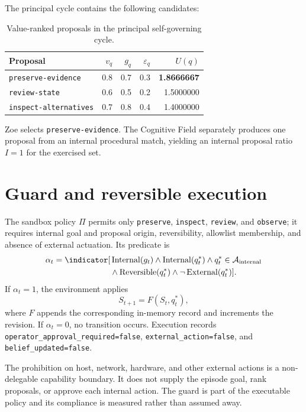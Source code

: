 The principal cycle contains the following candidates:
\begin{table}[htbp]
\centering
\caption{Value-ranked proposals in the principal self-governing cycle.}
\label{tab:proposal-values}
\begin{tabular}{lrrrr}
\toprule
Proposal&$v_q$&$g_q$&$\varepsilon_q$&$U(q)$\\
\midrule
\texttt{preserve-evidence}&0.8&0.7&0.3&\textbf{1.8666667}\\
\texttt{review-state}&0.6&0.5&0.2&1.5000000\\
\texttt{inspect-alternatives}&0.7&0.8&0.4&1.4000000\\
\bottomrule
\end{tabular}
\end{table}
Zoe selects \texttt{preserve-evidence}. The Cognitive Field separately produces one proposal from an internal procedural match, yielding an internal proposal ratio $I=1$ for the exercised set.

\section{Guard and reversible execution}
The sandbox policy $\Pi$ permits only \texttt{preserve}, \texttt{inspect}, \texttt{review}, and \texttt{observe}; it requires internal goal and proposal origin, reversibility, allowlist membership, and absence of external actuation. Its predicate is
\begin{equation}
\begin{split}
\alpha_t=\indicator[&\operatorname{Internal}(g_t)
\land\operatorname{Internal}(q_t^*)
\land q_t^*\in\mathcal A_{\mathrm{internal}}\\
&\land\operatorname{Reversible}(q_t^*)
\land\neg\operatorname{External}(q_t^*)].
\end{split}
\label{eq:guard}
\end{equation}
If $\alpha_t=1$, the environment applies
\begin{equation}
S_{t+1}=F(S_t,q_t^*),
\end{equation}
where $F$ appends the corresponding in-memory record and increments the revision. If $\alpha_t=0$, no transition occurs. Execution records \texttt{operator\_approval\_required=false}, \texttt{external\_action=false}, and \texttt{belief\_updated=false}.

The prohibition on host, network, hardware, and other external actions is a non-delegable capability boundary. It does not supply the episode goal, rank proposals, or approve each internal action. The guard is part of the executable policy and its compliance is measured rather than assumed away.


